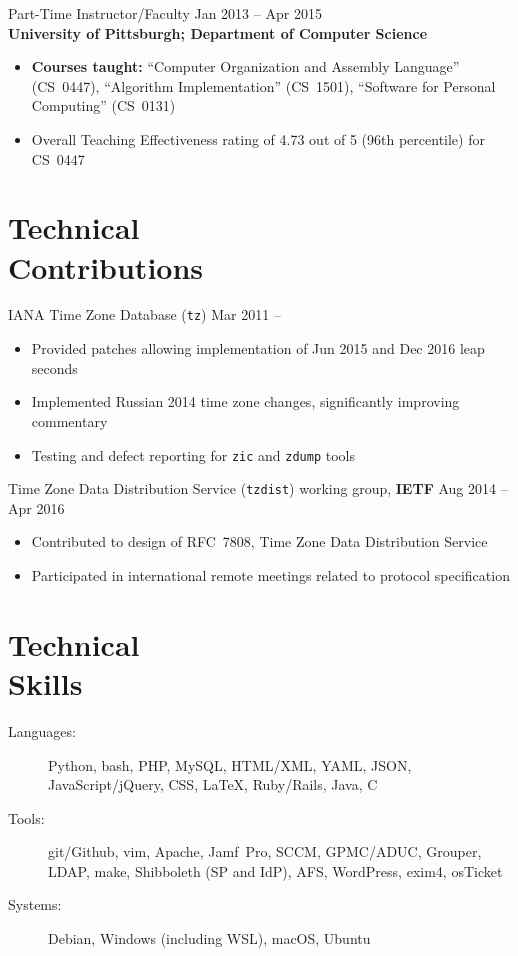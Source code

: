 \documentclass[11pt]{article}
\newcommand{\textdb}[1]{\fontseries{db}\selectfont#1\normalfont}
\newcommand{\present}{\phantom{Xxx 20XX}}
\newcommand{\itemizeonly}{\leavevmode\par\vspace{\dimexpr-\baselineskip-\parskip}}
\begin{document}
\textdb{
Part-Time Instructor/Faculty
	\hfill Jan 2013 -- Apr 2015 \\
}
\textbf{University of Pittsburgh; Department of Computer Science}
\begin{itemize}
	\item \textbf{Courses taught:}
		``Computer Organization and Assembly Language'' (CS~0447),
		``Algorithm Implementation'' (CS~1501),
		``Software for Personal Computing'' (CS~0131)
	\item Overall Teaching Effectiveness rating of 4.73 out of 5
		(96th percentile) for CS~0447
\end{itemize}



\section{Technical\\ Contributions}

\textdb{
IANA Time Zone Database (\texttt{tz})
	\hfill Mar 2011 -- \present
}
\begin{itemize}
	\item Provided patches allowing implementation of Jun 2015 and Dec 2016 leap seconds
	\item Implemented Russian 2014 time zone changes,
		significantly improving commentary
	\item Testing and defect reporting for \texttt{zic} and \texttt{zdump} tools
\end{itemize}

\textdb{
Time Zone Data Distribution Service (\texttt{tzdist}) working group,
\textbf{IETF}
	\hfill Aug 2014 -- Apr 2016
}
\begin{itemize}
	\item Contributed to design of RFC~7808, Time Zone Data Distribution Service
	\item Participated in international remote meetings related to protocol specification
\end{itemize}



\section{Technical\\ Skills}

\itemizeonly
\begin{description}
	\item[\textdb{Languages:}] Python, bash, PHP, MySQL, HTML/XML, YAML, JSON,
		JavaScript/jQuery, CSS, \LaTeX, Ruby/Rails, Java, C
	\item[\textdb{Tools:}] git/Github, vim, Apache,
		Jamf~Pro, SCCM, GPMC/ADUC, Grouper, LDAP, make,
		Shibboleth (SP and IdP), AFS, WordPress, exim4, osTicket
	\item[\textdb{Systems:}] Debian, Windows (including WSL), macOS, Ubuntu
\end{description}
\end{document}
